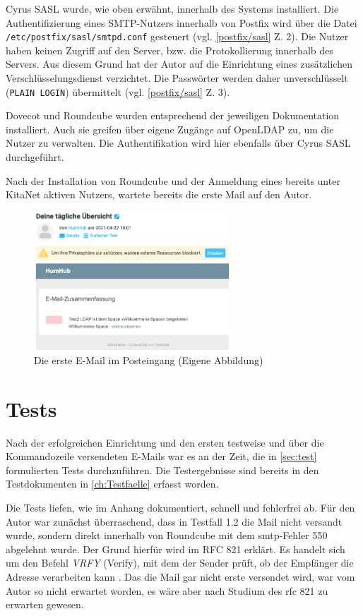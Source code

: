 Cyrus SASL wurde, wie oben erwähnt, innerhalb des Systems installiert. 
Die Authentifizierung eines SMTP-Nutzers innerhalb von Postfix wird über die Datei\\\verb+/etc/postfix/sasl/smtpd.conf+ gesteuert (vgl. \autoref{postfix/sasl} Z. 2). 
Die Nutzer haben keinen Zugriff auf den Server, bzw. die Protokollierung innerhalb des Servers.
Aus diesem Grund hat der Autor auf die Einrichtung eines zusätzlichen Verschlüsselungsdienst verzichtet. 
Die Passwörter werden daher unverschlüsselt (\verb+PLAIN LOGIN+) übermittelt (vgl. \autoref{postfix/sasl} Z. 3). 

Dovecot und Roundcube wurden entsprechend der jeweiligen Dokumentation installiert. Auch sie greifen über eigene Zugänge auf OpenLDAP zu, um die Nutzer zu verwalten. Die Authentifikation wird hier ebenfalls über Cyrus SASL durchgeführt.

Nach der Installation von Roundcube und der Anmeldung eines bereits unter KitaNet aktiven Nutzers, wartete bereits die erste Mail auf den Autor.

\begin{figure}[H]
  \centering
  \includegraphics[width=0.65\textwidth]{res/erste Mail.png}
  \caption{Die erste E-Mail im Posteingang (Eigene Abbildung)}
  \label{fig:Mail}
\end{figure}

\section{Tests}{}
Nach der erfolgreichen Einrichtung und den ersten testweise und über die Kommandozeile versendeten E-Mails war es an der Zeit, die in \autoref{sec:test} formulierten Tests durchzuführen. Die Testergebnisse sind bereits in den Testdokumenten in \autoref{ch:Testfaelle} erfasst worden.

Die Tests liefen, wie im Anhang dokumentiert, schnell und fehlerfrei ab. Für den Autor war zunächst überraschend, dass in Testfall 1.2 die Mail nicht versandt wurde, sondern direkt innerhalb von Roundcube mit dem \ac{smtp}-Fehler 550 abgelehnt wurde. 
Der Grund hierfür wird im RFC 821 erklärt. 
Es handelt sich um den Befehl \textit{VRFY} (Verify), mit dem der Sender prüft, ob der Empfänger die Adresse verarbeiten kann \citep[vgl.][8]{rfc821}.
Das die Mail gar nicht erste versendet wird, war vom Autor so nicht erwartet worden, es wäre aber nach Studium des \ac{rfc} 821 zu erwarten gewesen.

